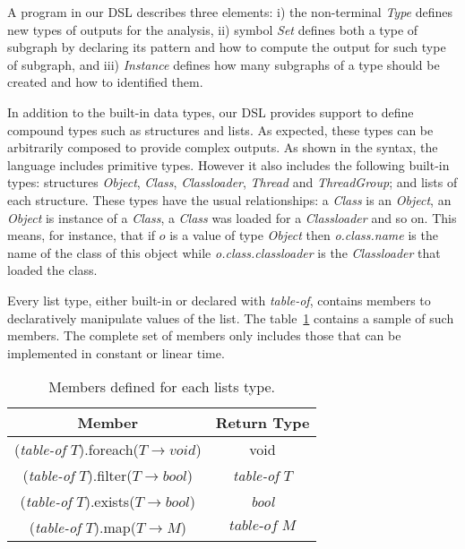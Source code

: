 A program in our DSL describes three elements: i) the non-terminal \textit{Type} defines new types of outputs for the analysis, ii) symbol \textit{Set} defines both a type of subgraph by declaring its pattern and how to compute the output for such type of subgraph, and iii) \textit{Instance} defines how many subgraphs of a type should be created and how to identified them.

In addition to the built-in data types, our DSL provides support to define compound types such as structures and lists.
As expected, these types can be arbitrarily composed to provide complex outputs.
As shown in the syntax, the language includes primitive types.
However it also includes the following built-in types: structures \textit{Object}, \textit{Class}, \textit{Classloader}, \textit{Thread} and \textit{ThreadGroup}; and lists of each structure.
These types have the usual relationships: a \textit{Class} is an \textit{Object}, an \textit{Object} is instance of a \textit{Class}, a \textit{Class} was loaded for a \textit{Classloader} and so on.
This means, for instance, that if $o$ is a value of type \textit{Object} then \textit{o.class.name} is the name of the class of this object while \textit{o.class.classloader} is the \textit{Classloader} that loaded the class.

Every list type, either built-in or declared with \textit{table-of}, contains members to declaratively manipulate values of the list.
The table~\ref{tab:members} contains a sample of such members.
The complete set of members only includes those that can be implemented in constant or linear time.  

\begin{table}
\centering
\begin{tabular}{|c|c|}
\hline \textbf{Member} & \textbf{Return Type} \\ 
\hline (\textit{table-of} $T$).foreach($T\to\textit{void}$) & void \\ 
\hline (\textit{table-of} $T$).filter($T\to\textit{bool}$) & \textit{table-of} $T$ \\ 
\hline (\textit{table-of} $T$).exists($T\to\textit{bool}$) &  \textit{bool} \\ 
\hline (\textit{table-of} $T$).map($T \to M$) & $\textit{table-of} \; M$ \\ 
\hline 
\end{tabular} 
\caption{Members defined for each lists type.}\label{tab:members}
\end{table}

